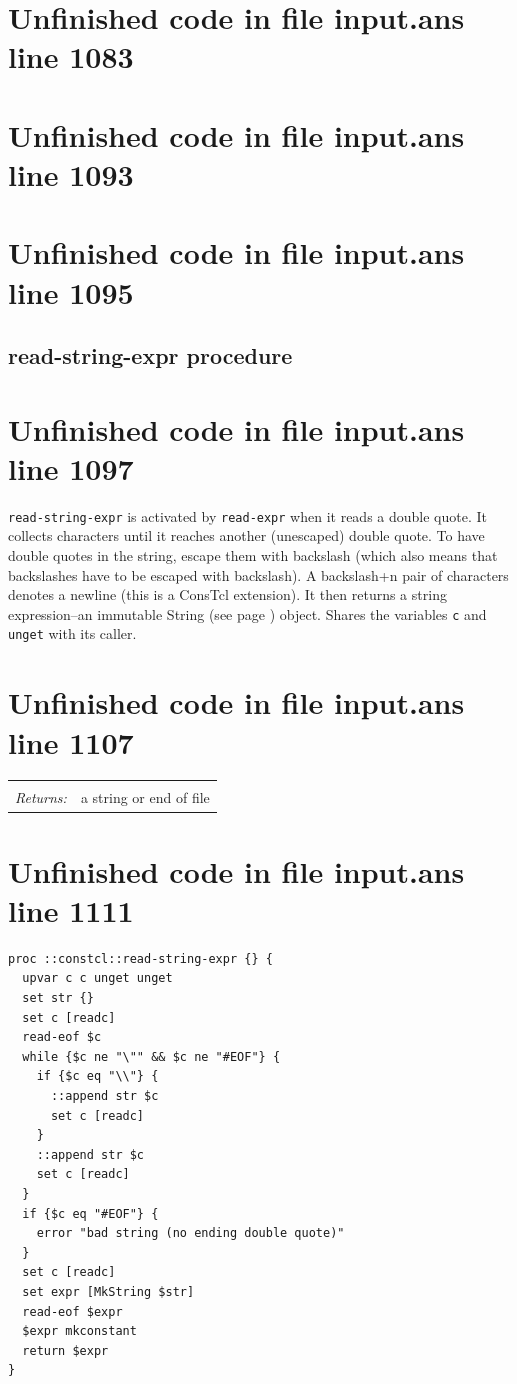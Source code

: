 \documentclass[twoside,9pt]{report}
\begin{document}
\section{Unfinished code in file input.ans line 1083}
\section{Unfinished code in file input.ans line 1093}
\section{Unfinished code in file input.ans line 1095}
\subsection{read-string-expr procedure}
\label{read-string-expr-procedure}
\section{Unfinished code in file input.ans line 1097}


\texttt{read-string-expr} is activated by \texttt{read-expr} when it reads a double quote. It collects characters until it reaches another (unescaped) double quote. To have double quotes in the string, escape them with backslash (which also means that backslashes have to be escaped with backslash). A backslash+n pair of characters denotes a newline (this is a ConsTcl extension). It then returns a string expression--an immutable String (see page \pageref{strings}) object. Shares the variables \texttt{c} and \texttt{unget} with its caller.

\section{Unfinished code in file input.ans line 1107}
\noindent\begin{tabular}{ |p{1.9cm} p{8cm}| }
\hline
\rowcolor[HTML]{CCCCCC} \multicolumn{2}{|l|}{\bf read-string-expr (internal)} \\
\textit{Returns:} & a string or end of file \\
\hline
\end{tabular}
\section{Unfinished code in file input.ans line 1111}
\begin{lstlisting}
proc ::constcl::read-string-expr {} {
  upvar c c unget unget
  set str {}
  set c [readc]
  read-eof $c
  while {$c ne "\"" && $c ne "#EOF"} {
    if {$c eq "\\"} {
      ::append str $c
      set c [readc]
    }
    ::append str $c
    set c [readc]
  }
  if {$c eq "#EOF"} {
    error "bad string (no ending double quote)"
  }
  set c [readc]
  set expr [MkString $str]
  read-eof $expr
  $expr mkconstant
  return $expr
}
\end{lstlisting}
\end{document}
